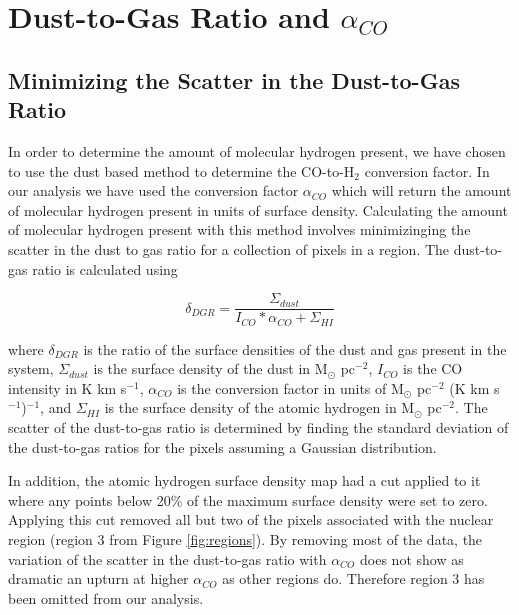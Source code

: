 \chapter{Dust-to-Gas Ratio and $\alpha_{CO}$}

\section{Minimizing the Scatter in the Dust-to-Gas Ratio}

In order to determine the amount of molecular hydrogen present, we have chosen to use the dust based method to determine the CO-to-H$_2$ conversion factor.  In our analysis we have used the conversion factor $\alpha_{CO}$ which will return the amount of molecular hydrogen present in units of surface density.  Calculating the amount of molecular hydrogen present with this method involves minimizinging the scatter in the dust to gas ratio for a collection of pixels in a region.  The dust-to-gas ratio is calculated using

\begin{equation}\label{eq:dgr}
  \delta_{DGR} = \frac{\Sigma_{dust}}{I_{CO}*\alpha_{CO} + \Sigma_{HI}}
\end{equation}

\noindent where $\delta_{DGR}$ is the ratio of the surface densities of the dust and gas present in the system, $\Sigma_{dust}$ is the surface density of the dust in M$_\odot$ pc$^{-2}$, $I_{CO}$ is the CO intensity in K km s$^{-1}$, $\alpha_{CO}$ is the conversion factor in units of M$_\odot$ pc$^{-2}$ (K km s$^{-1}$)$^{-1}$, and $\Sigma_{HI}$ is the surface density of the atomic hydrogen in M$_\odot$ pc$^{-2}$.  The scatter of the dust-to-gas ratio is determined by finding the standard deviation of the dust-to-gas ratios for the pixels assuming a Gaussian distribution.  

In addition, the atomic hydrogen surface density map had a cut applied to it where any points below 20\% of the maximum surface density were set to zero.  Applying this cut removed all but two of the pixels associated with the nuclear region (region 3 from Figure \ref{fig:regions}).  By removing most of the data, the variation of the scatter in the dust-to-gas ratio with $\alpha_{CO}$ does not show as dramatic an upturn at higher $\alpha_{CO}$ as other regions do.  Therefore region 3 has been omitted from our analysis.

